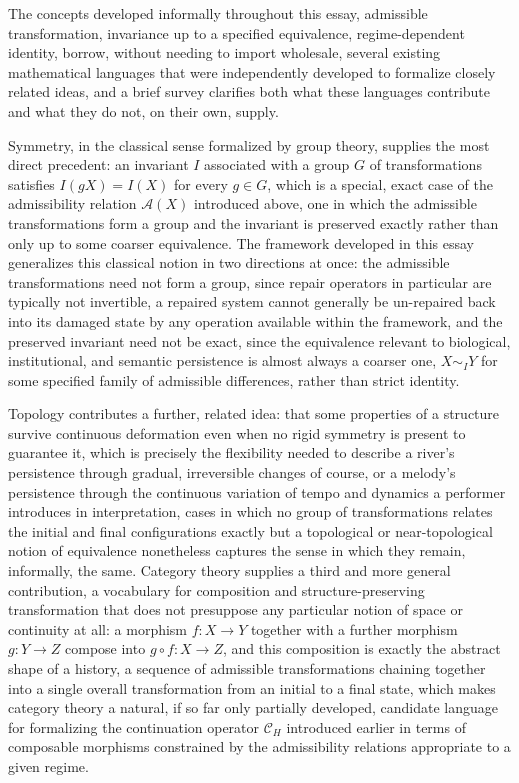 \documentclass[11pt]{article}
\begin{document}
The concepts developed informally throughout this essay, admissible transformation, invariance up to a specified equivalence, regime-dependent identity, borrow, without needing to import wholesale, several existing mathematical languages that were independently developed to formalize closely related ideas, and a brief survey clarifies both what these languages contribute and what they do not, on their own, supply.

Symmetry, in the classical sense formalized by group theory, supplies the most direct precedent: an invariant $I$ associated with a group $G$ of transformations satisfies $I(gX) = I(X)$ for every $g \in G$, which is a special, exact case of the admissibility relation $\mathcal{A}(X)$ introduced above, one in which the admissible transformations form a group and the invariant is preserved exactly rather than only up to some coarser equivalence. The framework developed in this essay generalizes this classical notion in two directions at once: the admissible transformations need not form a group, since repair operators in particular are typically not invertible, a repaired system cannot generally be un-repaired back into its damaged state by any operation available within the framework, and the preserved invariant need not be exact, since the equivalence relevant to biological, institutional, and semantic persistence is almost always a coarser one, $X \sim_I Y$ for some specified family of admissible differences, rather than strict identity.

Topology contributes a further, related idea: that some properties of a structure survive continuous deformation even when no rigid symmetry is present to guarantee it, which is precisely the flexibility needed to describe a river's persistence through gradual, irreversible changes of course, or a melody's persistence through the continuous variation of tempo and dynamics a performer introduces in interpretation, cases in which no group of transformations relates the initial and final configurations exactly but a topological or near-topological notion of equivalence nonetheless captures the sense in which they remain, informally, the same. Category theory supplies a third and more general contribution, a vocabulary for composition and structure-preserving transformation that does not presuppose any particular notion of space or continuity at all: a morphism $f: X \to Y$ together with a further morphism $g: Y \to Z$ compose into $g \circ f: X \to Z$, and this composition is exactly the abstract shape of a history, a sequence of admissible transformations chaining together into a single overall transformation from an initial to a final state, which makes category theory a natural, if so far only partially developed, candidate language for formalizing the continuation operator $\mathcal{C}_H$ introduced earlier in terms of composable morphisms constrained by the admissibility relations appropriate to a given regime.
\end{document}
